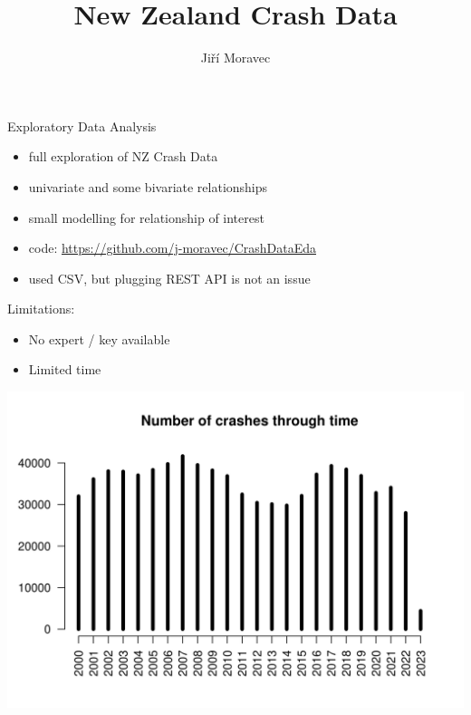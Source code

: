 \documentclass[xcolor=dvipsnames,xcolor=table, 14p]{beamer}
\author[J. M.]{Jiří Moravec}
\title[NZCD]{New Zealand Crash Data}
\date{}
\begin{document}
\begin{frame}
\maketitle
\end{frame}

\begin{frame}
Exploratory Data Analysis
\begin{itemize}
    \item full exploration of NZ Crash Data
    \item univariate and some bivariate relationships
    \item small modelling for relationship of interest
    \item code: \url{https://github.com/j-moravec/CrashDataEda}
    \item used CSV, but plugging REST API is not an issue
\end{itemize}

Limitations:
\begin{itemize}
    \item No expert / key available
    \item Limited time
\end{itemize}
\end{frame}

\begin{frame}
    \centering
    \includegraphics[width=1\textwidth]{figures/time-1.png}
\end{frame}
\end{document}
